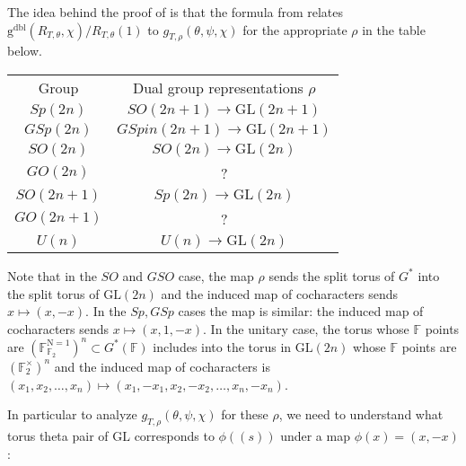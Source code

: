 \documentclass[12pt, reqno]{amsart}
\theoremstyle{definition}
\theoremstyle{definition}
\theoremstyle{definition}
\newcommand{\GL}{\mathrm{GL}}
\newcommand{\aFieldNorm}{\mathrm{N}}
\newcommand{\finiteField}{\mathbb{F}}
\newcommand{\finiteFieldExtension}[1]{\finiteField_{#1}}
\newcommand{\NormOneGroup}[1]{\finiteFieldExtension{#1}^{\aFieldNorm = 1}}
\newcommand{\dblVirtualGaussSumScalar}[2]{\mathrm{g}^{\mathrm{dbl}}\left(#1, #2\right)}
\begin{document}
The idea behind the proof of  is that the formula from  relates $\dblVirtualGaussSumScalar{R_{T, \theta}}{\chi}/R_{T,\theta}(1)$ to $g_{T,\rho}(\theta,\psi,\chi)$ for the appropriate $\rho$ in the table below. 
\begin{center}
\begin{tabular}{ c c}
 Group & Dual group representations $\rho$ \\ 
 $Sp(2n)$ &$SO(2n+1) \to \GL(2n+1)$\\  
 $GSp(2n)$  &$GSpin(2n+1) \to \GL(2n+1)$ \\
 $SO(2n)$ &$SO(2n) \to \GL(2n)$ \\
 $GO(2n)$ & ? \\
 $SO(2n+1)$ &$Sp(2n) \to \GL(2n)$ \\
 $GO(2n+1)$ & ? \\ 
  $U(n)$  & $U(n) \to \GL(2n)$  
\end{tabular}
\end{center}
Note that in the $SO$ and $GSO$ case, the map $\rho$ sends the split torus of $G^*$ into the split torus of $\GL(2n)$ and the induced map of cocharacters sends $x \mapsto (x,-x)$. In the $Sp,GSp$ cases the map is similar: the induced map of cocharacters sends $x \mapsto (x,1,-x)$. In the unitary case, the torus whose $\finiteField$ points are $(\NormOneGroup{\finiteFieldExtension{2}})^n \subset G^*(\finiteField)$ includes into the torus in $\GL(2n)$ whose $\finiteField$ points are $(\finiteFieldExtension{2}^\times)^n$ and the induced map of cocharacters is $(x_1,x_2, \hdots, x_n) \mapsto (x_1,-x_1,x_2,-x_2, \hdots ,x_n,-x_n)$. 


In particular to analyze $g_{T,\rho}(\theta,\psi,\chi)$ for these $\rho$, we need to understand what torus theta pair of $\GL$ corresponds to $\phi((s))$ under a map $\phi(x) = (x,-x)$:
\end{document}
